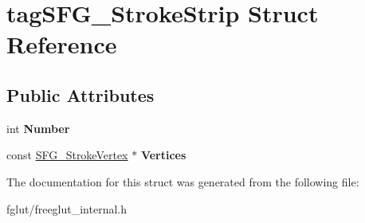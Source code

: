 \hypertarget{structtag_s_f_g___stroke_strip}{}\section{tag\+S\+F\+G\+\_\+\+Stroke\+Strip Struct Reference}
\label{structtag_s_f_g___stroke_strip}
\subsection*{Public Attributes}
\begin{DoxyCompactItemize}
\item 
int {\bfseries Number}\hypertarget{structtag_s_f_g___stroke_strip_abab1787c8e9e1681037a5c9a2303f141}{}\label{structtag_s_f_g___stroke_strip_abab1787c8e9e1681037a5c9a2303f141}

\item 
const \hyperlink{structtag_s_f_g___stroke_vertex}{S\+F\+G\+\_\+\+Stroke\+Vertex} $\ast$ {\bfseries Vertices}\hypertarget{structtag_s_f_g___stroke_strip_a96936c057c1e3bb71fb98159fa6a1b12}{}\label{structtag_s_f_g___stroke_strip_a96936c057c1e3bb71fb98159fa6a1b12}

\end{DoxyCompactItemize}


The documentation for this struct was generated from the following file\+:\begin{DoxyCompactItemize}
\item 
fglut/freeglut\+\_\+internal.\+h\end{DoxyCompactItemize}
